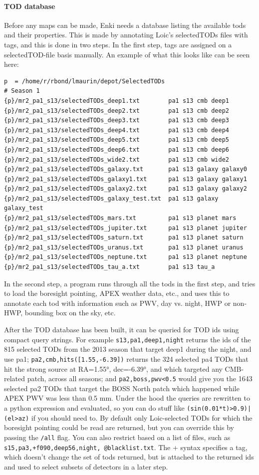 \documentclass[a4paper, 11pt]{article}
\begin{document}
\paragraph{TOD database}
Before any maps can be made, Enki needs a database listing the available tods and their properties.
This is made by annotating Loic's selectedTODs files with tags, and this is done in two steps.
In the first step, tags are assigned on a selectedTOD-file basis manually. An example of what this
looks like can be seen here:
\begin{verbatim}
p  = /home/r/rbond/lmaurin/depot/SelectedTODs
# Season 1
{p}/mr2_pa1_s13/selectedTODs_deep1.txt        pa1 s13 cmb deep1
{p}/mr2_pa1_s13/selectedTODs_deep2.txt        pa1 s13 cmb deep2
{p}/mr2_pa1_s13/selectedTODs_deep3.txt        pa1 s13 cmb deep3
{p}/mr2_pa1_s13/selectedTODs_deep4.txt        pa1 s13 cmb deep4
{p}/mr2_pa1_s13/selectedTODs_deep5.txt        pa1 s13 cmb deep5
{p}/mr2_pa1_s13/selectedTODs_deep6.txt        pa1 s13 cmb deep6
{p}/mr2_pa1_s13/selectedTODs_wide2.txt        pa1 s13 cmb wide2
{p}/mr2_pa1_s13/selectedTODs_galaxy.txt       pa1 s13 galaxy galaxy0
{p}/mr2_pa1_s13/selectedTODs_galaxy1.txt      pa1 s13 galaxy galaxy1
{p}/mr2_pa1_s13/selectedTODs_galaxy2.txt      pa1 s13 galaxy galaxy2
{p}/mr2_pa1_s13/selectedTODs_galaxy_test.txt  pa1 s13 galaxy galaxy_test
{p}/mr2_pa1_s13/selectedTODs_mars.txt         pa1 s13 planet mars
{p}/mr2_pa1_s13/selectedTODs_jupiter.txt      pa1 s13 planet jupiter
{p}/mr2_pa1_s13/selectedTODs_saturn.txt       pa1 s13 planet saturn
{p}/mr2_pa1_s13/selectedTODs_uranus.txt       pa1 s13 planet uranus
{p}/mr2_pa1_s13/selectedTODs_neptune.txt      pa1 s13 planet neptune
{p}/mr2_pa1_s13/selectedTODs_tau_a.txt        pa1 s13 tau_a
\end{verbatim}
In the second step, a program runs through all the tods in the first step, and tries
to load the boresight pointing, APEX weather data, etc., and uses this to annotate each
tod with information such as PWV, day vs. night, HWP or non-HWP, bounding box on the sky, etc.

After the TOD database has been built, it can be queried for TOD ids using compact query strings.
For example \texttt{s13,pa1,deep1,night} returns the ids of the 815 selected TODs from the 2013 season
that target deep1 during the night, and use pa1; \texttt{pa2,cmb,hits([1.55,-6.39])} returns
the 324 selected pa4 TODs that hit the strong source at RA=\ang{1.55}, dec=\ang{-6.39}, and
which targeted any CMB-related patch, across all seasons; and \texttt{pa2,boss,pwv<0.5} would
give you the 1643 selected pa2 TODs that target the BOSS North patch which happened while
APEX PWV was less than 0.5 mm. Under the hood the queries are rewritten to a python
expression and evaluated, so you can do stuff like \texttt{(sin(0.01*t)>0.9)|(el>az)} if you should need to.
By default only Loic-selected TODs for which the boresight pointing could be read are returned,
but you can override this by passing the \texttt{/all} flag. You can also restrict based on a list
of files, such as \texttt{s15,pa3,+f090,deep56,night,~@blacklist.txt}. The + syntax specifies a tag,
which doesn't change the set of tods returned, but is attached to the returned ids and used to select
subsets of detectors in a later step.
\end{document}
